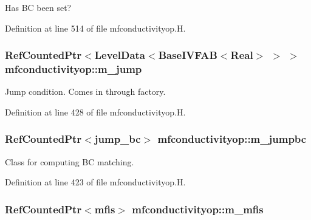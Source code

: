 Has BC been set? 



Definition at line 514 of file mfconductivityop.\+H.

\subsubsection[{\texorpdfstring{m\+\_\+jump}{m_jump}}]{\setlength{\rightskip}{0pt plus 5cm}Ref\+Counted\+Ptr$<$Level\+Data$<$Base\+I\+V\+F\+AB$<$Real$>$ $>$ $>$ mfconductivityop\+::m\+\_\+jump\hspace{0.3cm}{\ttfamily [protected]}}\hypertarget{classmfconductivityop_a4396aca09bb70bc27b406a93c2aabdc2}{}\label{classmfconductivityop_a4396aca09bb70bc27b406a93c2aabdc2}


Jump condition. Comes in through factory. 



Definition at line 428 of file mfconductivityop.\+H.

\subsubsection[{\texorpdfstring{m\+\_\+jumpbc}{m_jumpbc}}]{\setlength{\rightskip}{0pt plus 5cm}Ref\+Counted\+Ptr$<${\bf jump\+\_\+bc}$>$ mfconductivityop\+::m\+\_\+jumpbc\hspace{0.3cm}{\ttfamily [protected]}}\hypertarget{classmfconductivityop_ad60577ff83d8edf2199182caf45bab04}{}\label{classmfconductivityop_ad60577ff83d8edf2199182caf45bab04}


Class for computing BC matching. 



Definition at line 423 of file mfconductivityop.\+H.

\subsubsection[{\texorpdfstring{m\+\_\+mfis}{m_mfis}}]{\setlength{\rightskip}{0pt plus 5cm}Ref\+Counted\+Ptr$<${\bf mfis}$>$ mfconductivityop\+::m\+\_\+mfis\hspace{0.3cm}{\ttfamily [protected]}}\hypertarget{classmfconductivityop_a1d11d83bdf0df1dbc3d55e2d2ffe9603}{}\label{classmfconductivityop_a1d11d83bdf0df1dbc3d55e2d2ffe9603}


